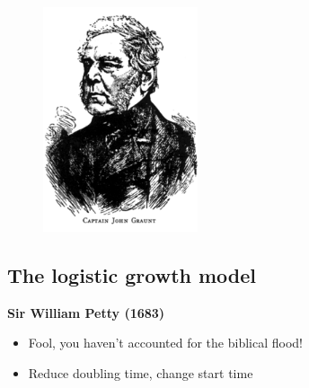 \documentclass[
  letterpaper,
  DIV=11,
  numbers=noendperiod]{scrartcl}
\begin{document}
\begin{figure}

\hfill{} \includegraphics[width=\textwidth,height=2.60417in]{images/JohnGraunt.png}

\end{figure}

\hypertarget{the-logistic-growth-model-1}{%
\subsection{The logistic growth
model}\label{the-logistic-growth-model-1}}

\textbf{Sir William Petty (1683)}

\begin{itemize}
\item
  Fool, you haven't accounted for the biblical flood!
\item
  Reduce doubling time, change start time
\end{itemize}
\end{document}

